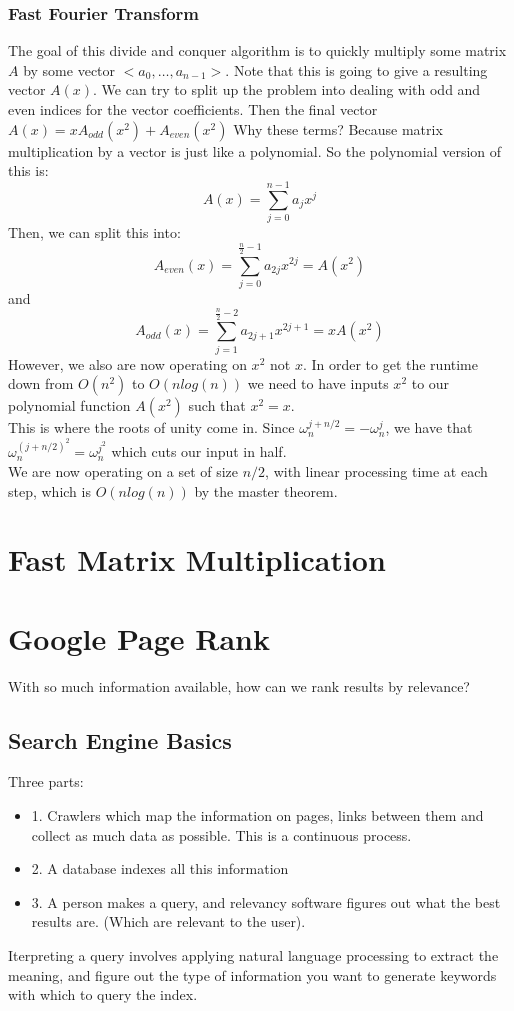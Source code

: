 \documentclass[12pt]{article}
\theoremstyle{definition}
\begin{document}
\subsubsection{Fast Fourier Transform}
The goal of this divide and conquer algorithm is to quickly multiply some matrix $A$ by some vector $<a_0,\dots,a_{n-1}>$. Note that this is going to give a resulting vector $A(x)$. We can try to split up the problem into dealing with odd and even indices for the vector coefficients. Then the final vector $A(x) = xA_{odd}(x^2) + A_{even}(x^2)$ Why these terms? Because matrix multiplication by a vector is just like a polynomial. So the polynomial version of this is:
$$ A(x) = \sum_{j=0}^{n-1}a_jx^j$$
Then, we can split this into:
$$ A_{even}(x) = \sum_{j=0}^{\frac{n}{2} -1} a_{2j}x^{2j} = A(x^2)$$
and
$$ A_{odd}(x) = \sum_{j=1}^{\frac{n}{2} -2}a_{2j+1}x^{2j+1} = xA(x^2)$$
 However, we also are now operating on $x^2$ not $x$. In order to get the runtime down from $O(n^2)$ to $O(nlog(n))$ we need to have inputs $x^2$ to our polynomial function $A(x^2)$ such that $x^2 = x$.
\\ \linebreak
This is where the roots of unity come in. Since $\omega_n^{j + n/2} = -\omega_n^{j}$, we have that $\omega_n^{(j + n/2)^2} = \omega_n^{j^2}$ which cuts our input in half.
\\ \linebreak
We are now operating on a set of size $n/2$, with linear processing time at each step, which is $O(nlog(n))$ by the master theorem.
\section{Fast Matrix Multiplication}


\section{Google Page Rank}
With so much information available, how can we rank results by relevance? 
\\ \linebreak
\subsection{Search Engine Basics}
Three parts:
\begin{itemize}
	\item 1. Crawlers which map the information on pages, links between them and collect as much data as possible. This is a continuous process.
	\item 2. A database indexes all this information
	\item 3. A person makes a query, and relevancy software figures out what the best results are. (Which are relevant to the user).
\end{itemize}
Iterpreting a query involves applying natural language processing to extract the meaning, and figure out the type of information you want to generate keywords with which to query the index.
\\ \linebreak
\end{document}
